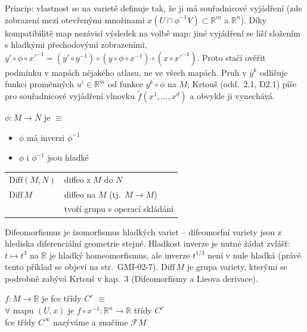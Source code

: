 \begin{vysvetleni}
Princip: vlastnost se na varietě definuje tak, že ji má souřadnicové vyjádření (zde zobrazení mezi otevřenými množinami $x(U\cap\phi^{-1}V)\subset\mathbb{R}^m$ a $\mathbb{R}^n$). Díky kompatibilitě map nezávisí výsledek na volbě map: jiné vyjádření se liší složením s hladkými přechodovými zobrazeními, $y'\circ\phi\circ x'^{-1} = (y'\circ y^{-1})\circ(y\circ\phi\circ x^{-1})\circ(x\circ x'^{-1})$. Proto stačí ověřit podmínku v mapách nějakého atlasu, ne ve všech mapách. Pruh v $\bar y^k$ odlišuje funkci proměnných $u^i\in\mathbb{R}^m$ od funkce $y^k\circ\phi$ na $M$; Krtouš (odd.~2.1, D2.1) píše pro souřadnicové vyjádření vlnovku $\tilde f(x^1,\dots,x^d)$ a obvykle ji vynechává.
\end{vysvetleni}

\begin{definice}[Diffeomorfismus]
$\phi: M\to N$ je  $\equiv$
\begin{itemize}[nosep]
  \item[] $\phi$ má inverzi $\phi^{-1}$
  \item[] $\phi$ i $\phi^{-1}$ jsou hladké
\end{itemize}
\begin{tabular}{@{}ll}
$\mathrm{Diff}(M,N)$ & diffeo z $M$ do $N$ \\
$\mathrm{Diff}\,M$ & diffeo na $M$ (tj.\ $M\to M$) \\
 & \quad tvoří grupu s operací skládání
\end{tabular}
\end{definice}

\begin{vysvetleni}[Difeomorfismus]
Difeomorfismus je izomorfismus hladkých variet -- difeomorfní variety jsou z hlediska diferenciální geometrie stejné. Hladkost inverze je nutné žádat zvlášť: $t\mapsto t^3$ na $\mathbb{R}$ je hladký homeomorfismus, ale inverze $t^{1/3}$ není v nule hladká (právě tento příklad se objeví na str.~GMI-02-7). $\mathrm{Diff}\,M$ je grupa  variety, kterými se podrobně zabývá Krtouš v kap.~3 (Difeomorfismy a Lieova derivace).
\end{vysvetleni}

\begin{definice}
$f: M\to\mathbb{R}$ je fce třídy $C^r$ $\equiv$ \\
\quad $\forall$ mapu $(U,x)$ je $f\circ x^{-1}:\mathbb{R}^n\to\mathbb{R}$ třídy $C^r$ \\
fce třídy $C^\infty$ nazýváme  a značíme $\mathcal{F}M$
\end{definice}

